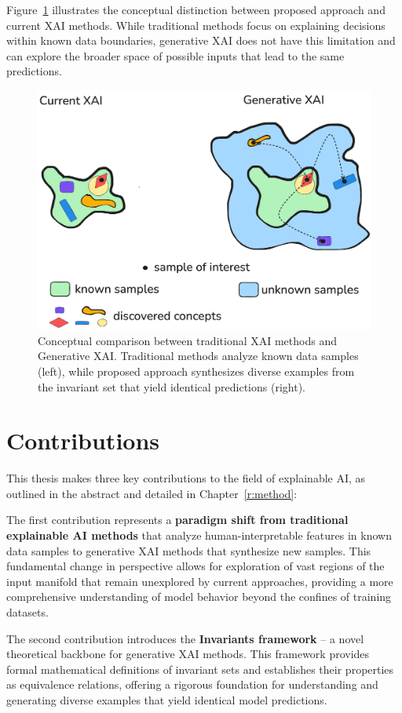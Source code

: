 \documentclass[licencjacka,en]{pracamgr}
\newcommand{\framework}[1]{Invariants}  %
\begin{document}
Figure~\ref{fig:1_teaser} illustrates the conceptual distinction between proposed approach and current XAI methods. While traditional methods focus on explaining decisions within known data boundaries, generative XAI does not have this limitation and can explore the broader space of possible inputs that lead to the same predictions.

\begin{figure}[h]
\centering
\includegraphics[width=0.8\linewidth]{figures/main/teaser1.png}
\caption{Conceptual comparison between traditional XAI methods and Generative XAI. Traditional methods analyze known data samples (left), while proposed approach synthesizes diverse examples from the invariant set that yield identical predictions (right).}
\label{fig:1_teaser}
\end{figure}

\section{Contributions}

This thesis makes three key contributions to the field of explainable AI, as outlined in the abstract and detailed in Chapter~\ref{r:method}:

The first contribution represents a \textbf{paradigm shift from traditional explainable AI methods} that analyze human-interpretable features in known data samples to generative XAI methods that synthesize new samples. This fundamental change in perspective allows for exploration of vast regions of the input manifold that remain unexplored by current approaches, providing a more comprehensive understanding of model behavior beyond the confines of training datasets.

The second contribution introduces the \textbf{\framework{} framework} -- a novel theoretical backbone for generative XAI methods. This framework provides formal mathematical definitions of invariant sets and establishes their properties as equivalence relations, offering a rigorous foundation for understanding and generating diverse examples that yield identical model predictions.
\end{document}
